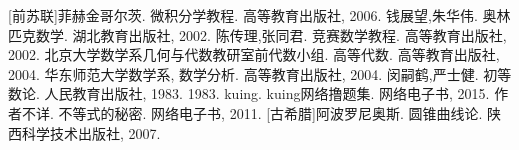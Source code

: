 
\begin{thebibliography}{99}
    [前苏联]菲赫金哥尔茨. 微积分学教程. 高等教育出版社, 2006.
    钱展望,朱华伟. 奥林匹克数学. 湖北教育出版社, 2002.
    陈传理,张同君. 竞赛数学教程. 高等教育出版社, 2002.
    北京大学数学系几何与代数教研室前代数小组. 高等代数. 高等教育出版社, 2004.
    华东师范大学数学系, 数学分析. 高等教育出版社, 2004.
    闵嗣鹤,严士健. 初等数论. 人民教育出版社, 1983. 1983.
    kuing. kuing网络撸题集. 网络电子书, 2015.
   作者不详. 不等式的秘密. 网络电子书, 2011.
   [古希腊]阿波罗尼奥斯. 圆锥曲线论. 陕西科学技术出版社, 2007.
\end{thebibliography}



